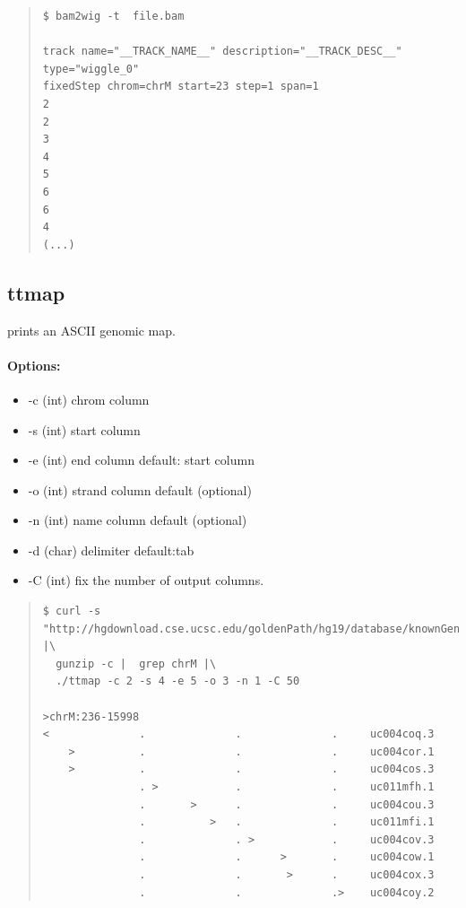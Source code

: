 \documentclass[12pt]{article}
\begin{document}
\begin{quote}
\begin{verbatim}
$ bam2wig -t  file.bam

track name="__TRACK_NAME__" description="__TRACK_DESC__" type="wiggle_0"
fixedStep chrom=chrM start=23 step=1 span=1
2
2
3
4
5
6
6
4
(...)
\end{verbatim}
\end{quote}

\subsection{ttmap}
prints an ASCII genomic map.
\paragraph{Options:}
\begin{itemize}
\item-c (int) chrom column
\item-s (int) start column
\item-e (int) end column default: start column
\item-o (int) strand column default (optional)
\item-n (int) name column default (optional)
\item-d (char) delimiter default:tab
\item-C (int) fix the number of output columns.
\end{itemize}


\begin{quote}
\begin{verbatim}
$ curl -s "http://hgdownload.cse.ucsc.edu/goldenPath/hg19/database/knownGene.txt.gz" |\
  gunzip -c |  grep chrM |\
  ./ttmap -c 2 -s 4 -e 5 -o 3 -n 1 -C 50

>chrM:236-15998
<              .              .              .     uc004coq.3
    >          .              .              .     uc004cor.1
    >          .              .              .     uc004cos.3
               . >            .              .     uc011mfh.1
               .       >      .              .     uc004cou.3
               .          >   .              .     uc011mfi.1
               .              . >            .     uc004cov.3
               .              .      >       .     uc004cow.1
               .              .       >      .     uc004cox.3
               .              .              .>    uc004coy.2

\end{verbatim}
\end{quote}
\end{document}
